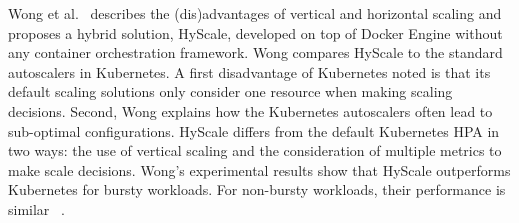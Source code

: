 Wong et al.~\citep{hyscale} describes the (dis)advantages of vertical and horizontal scaling and proposes a hybrid solution, HyScale, developed on top of Docker Engine without any container orchestration framework. 
%
%
%
%
Wong compares HyScale to the standard autoscalers in Kubernetes. A first disadvantage of Kubernetes noted is that its default scaling solutions only consider one resource when making scaling decisions. Second, Wong explains how the Kubernetes autoscalers often lead to sub-optimal configurations. 
HyScale differs from the default Kubernetes HPA in two ways: the use of vertical scaling and the consideration of multiple metrics to make scale decisions. 
Wong's experimental results show that HyScale outperforms Kubernetes for bursty workloads. For non-bursty workloads, their performance is similar
~\citep{hyscale}.


